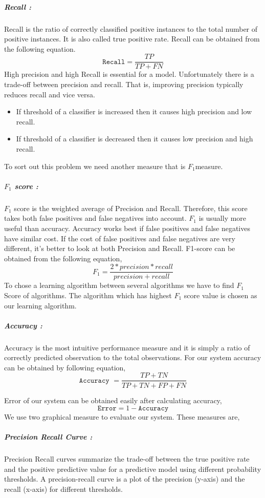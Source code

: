 \subparagraph{Recall :}
Recall is the ratio of correctly classified positive instances to the total number of positive instances. It is also called true positive rate. Recall can be obtained from the following equation.
\begin{equation}
    \texttt{Recall} = \frac{TP}{TP+FN}
\end{equation}
High precision and high Recall is essential for a model. Unfortunately there is a trade-off between precision and recall. That is, improving precision typically reduces recall and vice versa. 
\begin{itemize}
    \item If threshold of a classifier is increased then it causes high precision and low recall.
    \item If threshold of a classifier is decreased then it causes low precision and high recall.
\end{itemize}
To sort out this problem we need another measure that is $F_1$measure.

\subparagraph{$F_1$ score :}
 $F_1$ score is the weighted average of Precision and Recall. Therefore, this score takes both false positives and false negatives into account. $F_1$ is usually more useful than accuracy. Accuracy works best if false positives and false negatives have similar cost. If the cost of false positives and false negatives are very different, it’s better to look at both Precision and Recall. F1-score can be obtained from the following equation,
 \begin{equation}
     F_1 = \frac{2*precision*recall}{precision+recall}
 \end{equation}
To chose a learning algorithm between several algorithms we have to find $F_1$ Score of algorithms. The algorithm which has highest $F_1$ score value is chosen as our learning algorithm.

\subparagraph{Accuracy :}
 Accuracy is the most intuitive performance measure and it is simply a ratio of correctly predicted observation to the total observations. For our system accuracy can be obtained by following equation,
\begin{equation}
    \texttt{Accuracy } = \frac{TP+TN}{TP+TN+FP+FN}
\end{equation}

Error of our system can be obtained easily after calculating accuracy,
\begin{equation}
    \texttt{Error} = 1-\texttt{Accuracy}
\end{equation}
We use two graphical measure to evaluate our system. These measures are,
\subparagraph{Precision Recall Curve :}
Precision Recall curves summarize the trade-off between the true positive rate and the positive predictive value for a predictive model using different probability thresholds. A precision-recall curve is a plot of the precision (y-axis) and the recall (x-axis) for different thresholds.

